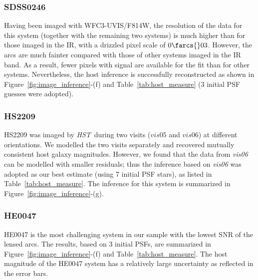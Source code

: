 \documentclass[fleqn,usenatbib]{mnras}
\newcommand{\hst}{{\it HST}}
\begin{document}
\subsubsection{SDSS0246}
Having been imaged with WFC3-UVIS/F814W, the resolution of the data for this system (together with the remaining two systems) is much higher than for those imaged in the IR, with a drizzled pixel scale of $0\farcs{}03$. However, the arcs are much fainter compared with those of other systems imaged in the IR band. As a result, fewer pixels with signal are available for the fit than for other systems. Nevertheless, the host inference is successfully reconstructed as shown in Figure~\ref{fig:image_inference}-(f) and Table~\ref{tab:host_measure} (3 initial PSF guesses were adopted).  

\subsubsection{HS2209}
HS2209 was imaged by \hst\ during two visits ($vis05$ and $vis06$) at different orientations. We modelled the two visits separately and recovered mutually consistent host galaxy magnitudes. However, we found that the data from {\it vis06} can be modelled with smaller residuals; thus the inference based on {\it vis06} was adopted as our best estimate (using 7 initial PSF stars), as listed in Table~\ref{tab:host_measure}. The inference for this system is summarized in Figure~\ref{fig:image_inference}-(g).

\subsubsection{HE0047}
HE0047 is the most challenging system in our sample with the lowest SNR of the lensed arcs. The results, based on 3 initial PSFs, are summarized in Figure~\ref{fig:image_inference}-(f) and Table~\ref{tab:host_measure}. The host magnitude of the HE0047 system has a relatively large uncertainty as reflected in the error bars.
\end{document}
